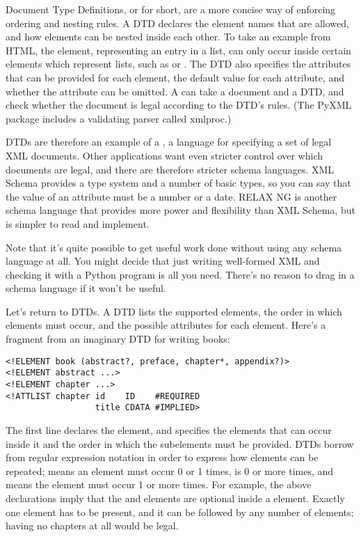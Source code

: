 \documentclass{howto}
\newcommand{\element}[1]{\code{#1}}
\begin{document}
Document Type Definitions, or  for short, are a more concise
way of enforcing ordering and nesting rules. A DTD declares the
element names that are allowed, and how elements can be nested inside
each other.  To take an example from HTML, the \element{LI} element,
representing an entry in a list, can only occur inside certain
elements which represent lists, such as \element{OL} or \element{UL}.
The DTD also specifies the attributes that can be provided for each
element, the default value for each attribute, and whether the
attribute can be omitted.  A  can take a
document and a DTD, and check whether the document is legal according
to the DTD's rules.  (The PyXML package includes a validating parser
called xmlproc.)

DTDs are therefore an example of a , a language
for specifying a set of legal XML documents.  Other applications want
even stricter control over which documents are legal, and there are
therefore stricter schema languages.  XML Schema provides a type
system and a number of basic types, so you can say that the value of
an attribute must be a number or a date.  RELAX NG is another schema
language that provides more power and flexibility than XML Schema, but
is simpler to read and implement.

Note that it's quite possible to get useful work done without using
any schema language at all.  You might decide that just writing
well-formed XML and checking it with a Python program is all you need.
There's no reason to drag in a schema language if it won't be useful.

Let's return to DTDs.  A DTD lists the supported elements, the order
in which elements must occur, and the possible attributes for each
element.  Here's a fragment from an imaginary DTD for writing books:

\begin{verbatim}
<!ELEMENT book (abstract?, preface, chapter*, appendix?)>
<!ELEMENT abstract ...>
<!ELEMENT chapter ...>
<!ATTLIST chapter id    ID    #REQUIRED 
                  title CDATA #IMPLIED>
\end{verbatim}

The first line declares the \element{book} element, and specifies the
elements that can occur inside it and the order in which the
subelements must be provided.  DTDs borrow from regular expression
notation in order to express how elements can be repeated; 
means an element must occur 0 or 1 times, \samp{*} is 0 or more times,
and \samp{+} means the element must occur 1 or more times.  For
example, the above declarations imply that the \element{abstract} and
\element{appendix} elements are optional inside a \element{book}
element.  Exactly one \element{preface} element has to be present, and
it can be followed by any number of \element{chapter} elements; having
no chapters at all would be legal.
\end{document}
